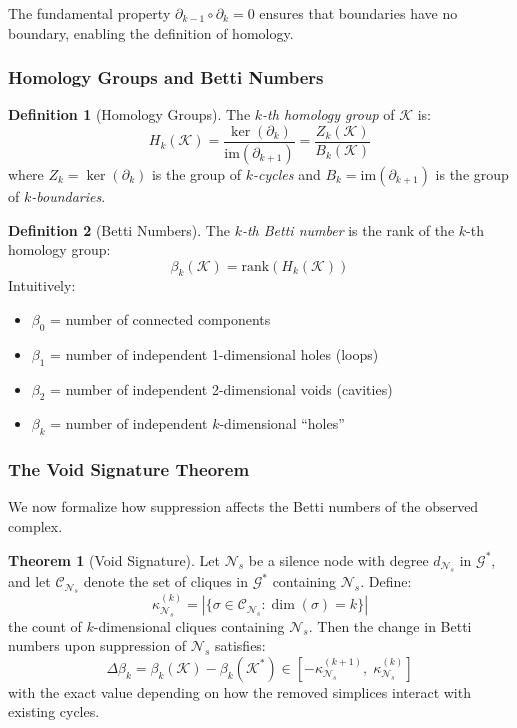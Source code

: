 \documentclass[12pt,a4paper]{article}
\theoremstyle{definition}
\newtheorem{definition}{Definition}[section]
\newtheorem{theorem}{Theorem}[section]
\theoremstyle{remark}
\newcommand{\NS}{\mathcal{N}_s}          %
\newcommand{\Graph}{\mathcal{G}}         %
\begin{document}
The fundamental property $\partial_{k-1} \circ \partial_k = 0$ ensures that boundaries have no boundary, enabling the definition of homology.

\subsubsection{Homology Groups and Betti Numbers}

\begin{definition}[Homology Groups]
The \emph{$k$-th homology group} of $\mathcal{K}$ is:
\begin{equation}
    H_k(\mathcal{K}) = \frac{\ker(\partial_k)}{\text{im}(\partial_{k+1})} = \frac{Z_k(\mathcal{K})}{B_k(\mathcal{K})}
\end{equation}
where $Z_k = \ker(\partial_k)$ is the group of \emph{$k$-cycles} and $B_k = \text{im}(\partial_{k+1})$ is the group of \emph{$k$-boundaries}.
\end{definition}

\begin{definition}[Betti Numbers]
The \emph{$k$-th Betti number} is the rank of the $k$-th homology group:
\begin{equation}
    \beta_k(\mathcal{K}) = \text{rank}(H_k(\mathcal{K}))
\end{equation}
Intuitively:
\begin{itemize}
    \item $\beta_0$ = number of connected components
    \item $\beta_1$ = number of independent 1-dimensional holes (loops)
    \item $\beta_2$ = number of independent 2-dimensional voids (cavities)
    \item $\beta_k$ = number of independent $k$-dimensional ``holes''
\end{itemize}
\end{definition}

\subsubsection{The Void Signature Theorem}

We now formalize how suppression affects the Betti numbers of the observed complex.

\begin{theorem}[Void Signature]
\label{thm:void-signature}
Let $\NS$ be a silence node with degree $d_{\NS}$ in $\Graph^*$, and let $\mathcal{C}_{\NS}$ denote the set of cliques in $\Graph^*$ containing $\NS$. Define:
\begin{equation}
    \kappa_{\NS}^{(k)} = |\{ \sigma \in \mathcal{C}_{\NS} : \dim(\sigma) = k \}|
\end{equation}
the count of $k$-dimensional cliques containing $\NS$. Then the change in Betti numbers upon suppression of $\NS$ satisfies:
\begin{equation}
    \boxed{
    \Delta \beta_k = \beta_k(\mathcal{K}) - \beta_k(\mathcal{K}^*) \in \left[ -\kappa_{\NS}^{(k+1)}, \; \kappa_{\NS}^{(k)} \right]
    }
\end{equation}
with the exact value depending on how the removed simplices interact with existing cycles.
\end{theorem}
\end{document}
